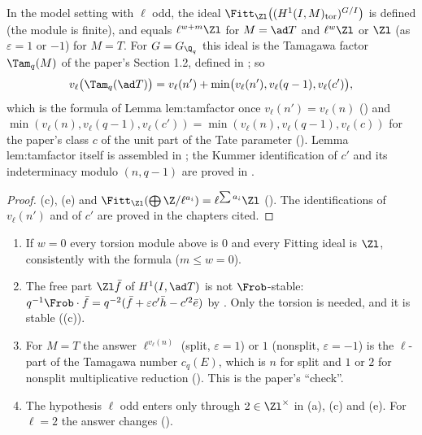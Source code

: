 \begin{corollary}\label{cor:cohomology:fitting}
In the model setting with $\ell$ odd, the ideal $\Fitt_{\Zl}\bigl((H^1(I,M)_{\mathrm{tor}})^{G/I}\bigr)$ is defined (the module is finite), and equals $\ell^{w+m}\Zl$ for $M=\ad T$ and
$\ell^w\Zl$ or $\Zl$ (as $\varepsilon=1$ or $-1$) for $M=T$. For $G=G_{\Q_q}$ this ideal is the Tamagawa factor $\Tam_q(M)$ of the paper's Section 1.2, defined in
; so
\[
v_\ell\bigl(\Tam_q(\ad T)\bigr)=v_\ell(n')+\min\bigl(v_\ell(n'),v_\ell(q-1),v_\ell(c')\bigr),
\]
which is the formula of Lemma lem:tamfactor once $v_\ell(n')=v_\ell(n)$ () and $\min(v_\ell(n),v_\ell(q-1),v_\ell(c'))=\min(v_\ell(n),v_\ell(q-1),v_\ell(c))$ for the
paper's class $c$ of the unit part of the Tate parameter (). Lemma lem:tamfactor itself is assembled in ; the Kummer
identification of $c'$ and its indeterminacy modulo $(n,q-1)$ are proved in .
\end{corollary}

\begin{proof}
(c), (e) and $\Fitt_{\Zl}(\bigoplus\Z/\ell^{a_i})=\ell^{\sum a_i}\Zl$ (). The identifications of $v_\ell(n')$ and of $c'$ are proved in the
chapters cited.
\end{proof}

\begin{remark}\label{rem:cohomology:model-remarks}
\begin{enumerate}[label=(\roman*)]
\item If $w=0$ every torsion module above is $0$ and every Fitting ideal is $\Zl$, consistently with the formula ($m\le w=0$).
\item The free part $\Zl\bar f$ of $H^1(I,\ad T)$ is not $\Frob$-stable: $q^{-1}\Frob\cdot\bar f=q^{-2}(\bar f+\varepsilon c'\bar h-c'^2\bar e)$ by . Only the
torsion is needed, and it is stable ((c)).
\item For $M=T$ the answer $\ell^{v_\ell(n)}$ (split, $\varepsilon=1$) or $1$ (nonsplit, $\varepsilon=-1$) is the $\ell$-part of the Tamagawa number $c_q(E)$, which is $n$ for
split and $1$ or $2$ for nonsplit multiplicative reduction (). This is the paper's ``check''.
\item The hypothesis $\ell$ odd enters only through $2\in\Zl^\times$ in (a), (c) and (e). For $\ell=2$ the answer changes ().
\end{enumerate}
\end{remark}

